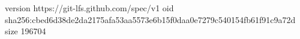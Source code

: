 version https://git-lfs.github.com/spec/v1
oid sha256:cbed6d38de2da2175afa53aa5573e6b15f0daa0e7279c540154fb61f91c9a72d
size 196704
